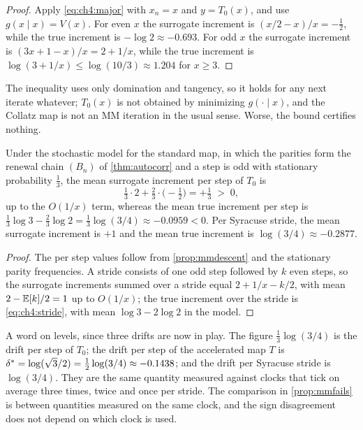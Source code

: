\begin{proof}
Apply \eqref{eq:ch4:major} with $x_n=x$ and $y=T_0(x)$, and use
$g(x\mid x)=V(x)$.  For even $x$ the surrogate increment is
$(x/2-x)/x=-\tfrac12$, while the true increment is $-\log2\approx-0.693$.  For
odd $x$ the surrogate increment is $(3x+1-x)/x=2+1/x$, while the true
increment is $\log(3+1/x)\le\log(10/3)\approx1.204$ for $x\ge3$.
\end{proof}

The inequality uses only domination and tangency, so it holds for any next
iterate whatever; $T_0(x)$ is not obtained by minimizing $g(\cdot\mid x)$, and
the Collatz map is not an MM iteration in the usual sense.  Worse, the bound
certifies nothing.

\begin{proposition}\label{prop:mmfails}
Under the stochastic model for the standard map, in which the parities
form the renewal chain $(B_n)$ of \cref{thm:autocorr} and a step is odd with
stationary probability $\tfrac13$, the mean surrogate increment per step of
$T_0$ is
\[
  \tfrac13\cdot2+\tfrac23\cdot\bigl(-\tfrac12\bigr)=+\tfrac13\;>\;0,
\]
up to the $O(1/x)$ term, whereas the mean true increment per step is
$\tfrac13\log3-\tfrac23\log2=\tfrac13\log(3/4)\approx-0.0959<0$.  Per Syracuse
stride, the mean surrogate increment is $+1$ and the mean true increment is
$\log(3/4)\approx-0.2877$.
\end{proposition}

\begin{proof}
The per step values follow from \cref{prop:mmdescent} and the stationary
parity frequencies.  A stride consists of one odd step followed by $k$ even
steps, so the surrogate increments summed over a stride equal
$2+1/x-k/2$, with mean $2-\mathbb{E}[k]/2=1$ up to $O(1/x)$; the true increment over
the stride is \eqref{eq:ch4:stride}, with mean $\log3-2\log2$ in the model.
\end{proof}

A word on levels, since three drifts are now in play.  The figure
$\tfrac13\log(3/4)$ is the drift per step of $T_0$; the drift per step of the
accelerated map $T$ is $\delta^{*}=\log(\sqrt3/2)=\tfrac12\log(3/4)\approx-0.1438$;
and the drift per Syracuse stride is $\log(3/4)$.  They are the same quantity
measured against clocks that tick on average three times, twice and once per
stride.  The comparison in \cref{prop:mmfails} is between quantities measured
on the same clock, and the sign disagreement does not depend on which clock is
used.


